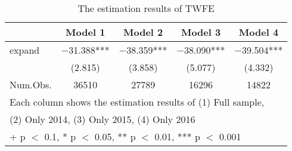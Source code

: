 \begin{table}
\centering
\begin{tabular}[t]{lcccc}
\toprule
  & Model 1 & Model 2 & Model 3 & Model 4\\
\midrule
expand & \num{-31.388}*** & \num{-38.359}*** & \num{-38.090}*** & \num{-39.504}***\\
 & (\num{2.815}) & (\num{3.858}) & (\num{5.077}) & (\num{4.332})\\
\midrule
Num.Obs. & \num{36510} & \num{27789} & \num{16296} & \num{14822}\\
\bottomrule
\multicolumn{5}{l}{\rule{0pt}{1em}Each column shows the estimation results of (1) Full sample,}\\
\multicolumn{5}{l}{\rule{0pt}{1em}(2) Only 2014, (3) Only 2015, (4) Only 2016}\\
\multicolumn{5}{l}{\rule{0pt}{1em}+ p $<$ 0.1, * p $<$ 0.05, ** p $<$ 0.01, *** p $<$ 0.001}\\
\end{tabular}
\caption{The estimation results of TWFE}
\end{table}
